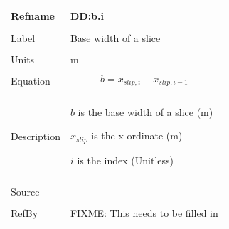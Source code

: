 \documentclass[12pt]{article}
\begin{document}
\noindent \begin{minipage}{\textwidth}
\begin{tabular}{p{} p{}}
\toprule \textbf{Refname} & \textbf{DD:b.i}
\label{DD:b.i}
\\ \midrule \\
Label & Base width of a slice
\\ \midrule \\
Units & m
\\ \midrule \\
Equation & \begin{dmath}
           b={x_{slip,i}}-{x_{slip,i-1}}
           \end{dmath}
\\ \midrule \\
Description & \begin{symbDescription}
              \item{$b$ is the base width of a slice (m)}
              \item{${x_{slip}}$ is the x ordinate (m)}
              \item{$i$ is the index (Unitless)}
              \end{symbDescription}
\\ \midrule \\
Source &
\\ \midrule \\
RefBy & FIXME: This needs to be filled in
\\ \bottomrule \end{tabular}
\end{minipage}\\
~\newline
\end{document}
